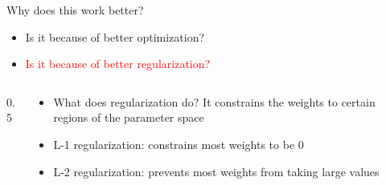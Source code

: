 \begin{frame}
\begin{flushleft}
	Why does this work better?
\end{flushleft}
	\vspace{-1em}
	\begin{itemize}
		\justifying
		\item Is it because of better optimization?
		\item \textcolor{red}{Is it because of better regularization?}
	\end{itemize}
	
\end{frame}


\begin{frame}
	\begin{columns}
		\begin{column} {0.5\textwidth}
			\begin{center}
				    
				
			\end{center}
			
		\end{column}
		\begin{column}{0.5\textwidth}
			\begin{itemize}
				\justifying
				\item<1-> What does regularization do? \onslide<2-> {It constrains the weights to certain regions of the parameter space}
				\item<3-> L-1 regularization: constrains most weights to be 0 
				\item<4-> L-2 regularization: prevents most weights from taking large values 
			\end{itemize}
			
		\end{column}
		
	\end{columns}
\end{frame}

